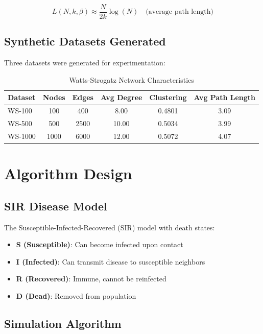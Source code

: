 \documentclass[12pt,a4paper]{article}
\begin{document}
\begin{equation}
L(N, k, \beta) \approx \frac{N}{2k} \log(N) \quad \text{(average path length)}
\end{equation}

\subsection{Synthetic Datasets Generated}

Three datasets were generated for experimentation:

\begin{table}[h]
\centering
\begin{tabular}{lccccc}
\toprule
\textbf{Dataset} & \textbf{Nodes} & \textbf{Edges} & \textbf{Avg Degree} & \textbf{Clustering} & \textbf{Avg Path Length} \\
\midrule
WS-100 & 100 & 400 & 8.00 & 0.4801 & 3.09 \\
WS-500 & 500 & 2500 & 10.00 & 0.5034 & 3.99 \\
WS-1000 & 1000 & 6000 & 12.00 & 0.5072 & 4.07 \\
\bottomrule
\end{tabular}
\caption{Watts-Strogatz Network Characteristics}
\end{table}

\section{Algorithm Design}

\subsection{SIR Disease Model}

The Susceptible-Infected-Recovered (SIR) model with death states:

\begin{itemize}
    \item \textbf{S (Susceptible)}: Can become infected upon contact
    \item \textbf{I (Infected)}: Can transmit disease to susceptible neighbors
    \item \textbf{R (Recovered)}: Immune, cannot be reinfected
    \item \textbf{D (Dead)}: Removed from population
\end{itemize}

\subsection{Simulation Algorithm}
\end{document}
